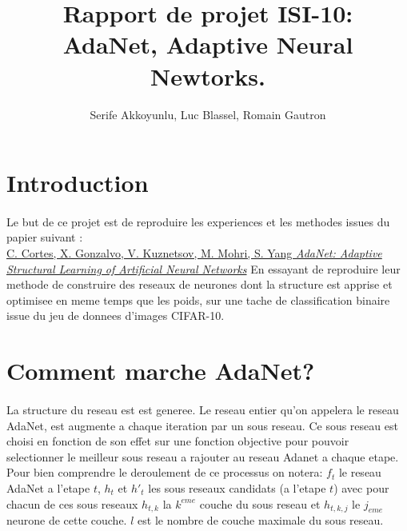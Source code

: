 \documentclass[11 pt]{article}
\title{Rapport de projet ISI-10:\\ AdaNet, Adaptive Neural Newtorks.}
\author{Serife Akkoyunlu, Luc Blassel, Romain Gautron}
\begin{document}
\maketitle
\section*{Introduction}
\paragraph{}Le but de ce projet est de reproduire les experiences et les methodes issues du papier suivant :\\
\href{https://arxiv.org/pdf/1607.01097.pdf}{C. Cortes, X. Gonzalvo, V. Kuznetsov, M. Mohri, S. Yang \emph{AdaNet: Adaptive Structural Learning of Artificial Neural Networks}}
En essayant de reproduire leur methode de construire des reseaux de neurones dont la structure est apprise et optimisee en meme temps que les poids, sur une tache de classification binaire issue du jeu de donnees d'images CIFAR-10.

\section{Comment marche AdaNet?}
\paragraph{}La structure du reseau est est generee. Le reseau entier qu'on appelera le reseau AdaNet, est augmente a chaque iteration par un sous reseau. Ce sous reseau est choisi en fonction de son effet sur une fonction objective pour pouvoir selectionner le meilleur sous reseau a rajouter au reseau Adanet a chaque etape. Pour bien comprendre le deroulement de ce processus on notera: $f_t$ le reseau AdaNet a l'etape $t$, $h_t$ et $h'_t$ les sous reseaux candidats (a l'etape $t$) avec pour chacun de ces sous reseaux $h_{t,k}$ la $k^{eme}$ couche du sous reseau et $h_{t,k,j}$ le $j_{eme}$ neurone de cette couche. $l$ est le nombre de couche maximale du sous reseau.
\end{document}
